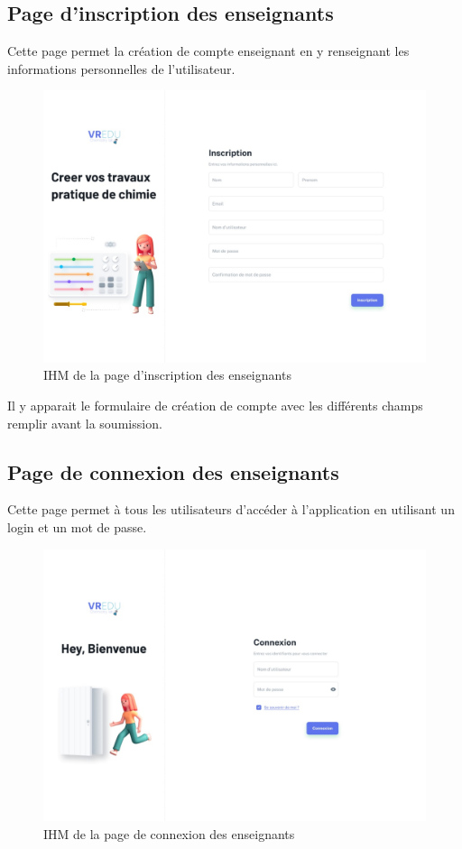 \subsection{Page d'inscription des enseignants}

Cette page permet la création de compte enseignant en y renseignant les informations personnelles de l'utilisateur.

\begin{figure}[H]
	\centering
	\includegraphics[width=1\textwidth]{img/insc}
	\caption{IHM de la page d'inscription des enseignants}
	\label{fig:mesh1}
\end{figure}

Il y apparait le formulaire de création de compte avec les différents champs remplir avant la soumission.

\subsection{Page de connexion des enseignants}

Cette page permet à tous les utilisateurs d’accéder à l’application en utilisant un login et
un mot de passe.

\begin{figure}[H]
	\centering
	\includegraphics[width=1\textwidth]{img/conn}
	\caption{IHM de la page de connexion des enseignants}
	\label{fig:mesh1}
\end{figure}

